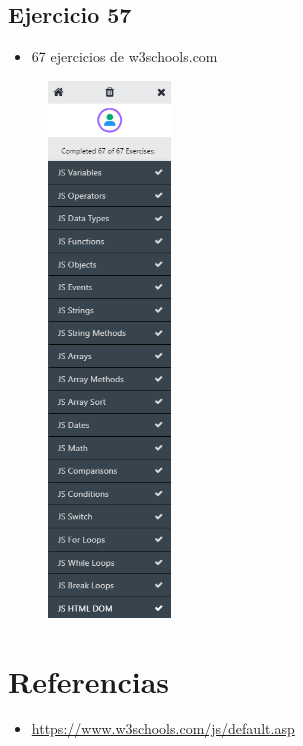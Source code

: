 \documentclass{article}
\begin{document}
	\subsection{Ejercicio 57}
	\begin{itemize}
		\item 67 ejercicios de w3schools.com 
	\end{itemize}
	\begin{figure}[H]
		\centering
		\includegraphics[width=0.29\textwidth, keepaspectratio]{img/ejercicios}
	\end{figure}
	
	
	
	
	\clearpage
	
	\section{Referencias}
	\begin{itemize}			
		\item \url{https://www.w3schools.com/js/default.asp}
	\end{itemize}	
	
	
\end{document}
